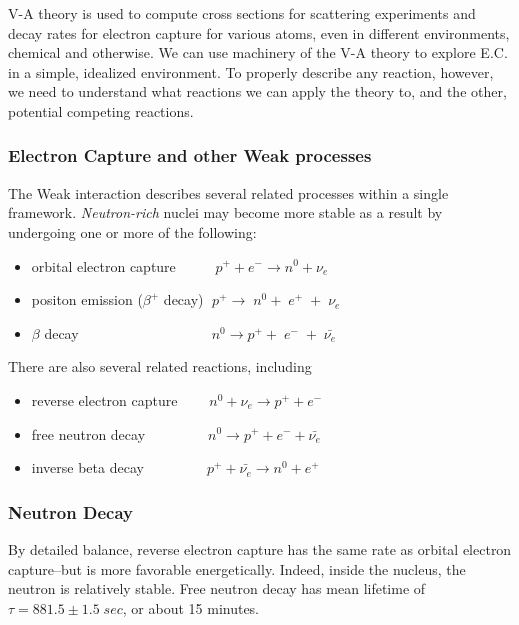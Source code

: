 \documentclass[%
 aip,
 jmp,%
 amsmath,amssymb,
 reprint,%
]{revtex4-1}
\begin{document}
V-A theory is used to compute cross sections for scattering experiments and decay rates for electron capture for various atoms,  even in different environments, chemical and otherwise.  We can use machinery of the V-A theory to explore E.C. in a simple, idealized environment.  To properly describe any reaction, however, we need to understand what reactions we can apply the theory to, and the other, potential competing reactions.

\subsubsection{Electron Capture and other Weak processes} 

The Weak interaction describes several related processes within a single framework.  \emph{Neutron-rich} nuclei may become more stable as a result by undergoing one or more of the following:


\begin{itemize}
\item orbital electron capture $\;\;\;\;\;\;\;\;\;p^{+}+e^{-} \rightarrow n^{0}+\nu_{e}$

\item positon emission ($\beta^{+}$ decay) $\;p^{+}\rightarrow\;n^{0}+\;e^{+}\;+\;\nu_{e}$ 
\item $\beta$ decay $\;\;\;\;\;\;\;\;\;\;\;\;\;\;\;\;\;\;\;\;\;\;\;\;\;\;\;\;\;\;\;\;\;n^{0}\rightarrow p^{+}+\;e^{-}\;+\;\bar{\nu_{e}}$
\end{itemize}

There are also several related reactions, including

\begin{itemize}
\item reverse electron capture  $\;\;\;\;\;\;\;n^{0}+\nu_{e}\rightarrow p^{+}+e^{-}$
\item free neutron decay  $\;\;\;\;\;\;\;\;\;\;\;\;\;\;\;n^{0}\rightarrow p^{+}+e^{-}+\bar{\nu_{e}}$ 
\item inverse beta decay  $\;\;\;\;\;\;\;\;\;\;\;\;\;\;\;p^{+}+\bar{\nu_{e}} \rightarrow n^{0}+e^{+}$
\end{itemize}


\subsubsection{Neutron Decay} 


By detailed balance,  reverse electron capture has the same rate as orbital electron capture--but is more favorable energetically.  Indeed, inside the nucleus, the neutron is relatively stable. Free neutron decay has mean lifetime of $\tau=881.5\pm1.5\;sec $, or about 15 minutes. 
\end{document}
